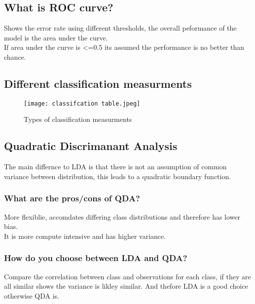 \documentclass[11pt]{scrartcl} %
\begin{document}
\subsection{What is ROC curve?}

Shows the error rate using different thresholds, the overall peformance of the model is the
area under the curve.\\

If area under the curve is <=0.5 its assumed the performance is no better than chance.

\subsection{Different classification measurments}

\begin{figure}[h] %
	\centering
	\texttt{[image: classifcation table.jpeg]} %
	\caption{Types of classification measurments}
\end{figure}

\subsection{Quadratic Discrimanant Analysis}

The main differnce to LDA is that there is not an assumption of common variance between distribution,
this leads to a quadratic boundary function. 

\subsubsection{What are the pros/cons of QDA?}

More flexiblie, accomdates differing class distributions and therefore has lower bias.\\

It is more compute intensive and has higher variance.

\subsubsection{How do you choose between LDA and QDA?}

Compare the correlation between class and observations for each class, if they are all similar shows
the variance is likley similar. And thefore LDA is a good choice otherwise QDA is.
\end{document}
